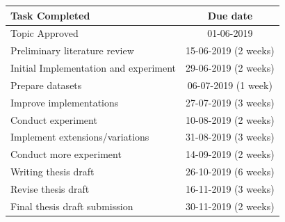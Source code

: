 \documentclass[runningheads]{llncs}
\begin{document}
	\begin{table}
		\centering
		\begin{tabular}{| l | c | }
			\hline
			Task Completed & Due date\\
			\hline
			Topic Approved & 01-06-2019  \\
			Preliminary literature review & 15-06-2019 (2 weeks) \\
			Initial Implementation and experiment & 29-06-2019 (2 weeks) \\
			Prepare datasets & 06-07-2019  (1 week) \\
			Improve implementations & 27-07-2019 (3 weeks) \\
			Conduct experiment & 10-08-2019 (2 weeks) \\
			Implement extensions/variations & 31-08-2019 (3 weeks) \\
			Conduct more experiment & 14-09-2019 (2 weeks) \\
			Writing thesis draft & 26-10-2019 (6 weeks) \\
			Revise thesis draft & 16-11-2019 (3 weeks) \\
			Final thesis draft submission & 30-11-2019 (2 weeks) \\
			\hline
		\end{tabular}
		
	\end{table}
	
	

	\newpage
	
	
	
	
\end{document}
